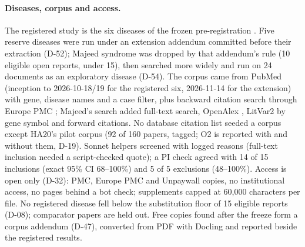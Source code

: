 \documentclass{article} %
\begin{document}
\paragraph{Diseases, corpus and access.} The registered study is the six diseases of the frozen pre-registration \citep{elhani2024_ha20_177,didiasova2020_ssadh_update,koseki2021_tangier_review,almarzanovoa2018_lad1_review,brambatti2019_danon_gender}. Five reserve diseases \citep{wouters2014_blau,vitali2022_lcat,stockleripsiroglu2014_gamt,beyens2018_ats,hajialigol2022_papa} were run under an extension addendum committed before their extraction (D-52); Majeed syndrome \citep{ferguson2021_majeed} was dropped by that addendum's rule (10 eligible open reports, under 15), then searched more widely and run on 24 documents as an exploratory disease (D-54). The corpus came from PubMed (inception to 2026-10-18/19 for the registered six, 2026-11-14 for the extension) with gene, disease names and a case filter, plus backward citation search through Europe PMC \citep{Rosonovski2023EuropePmc}; Majeed's search added full-text search, OpenAlex \citep{Priem2022OpenalexFullyopen}, LitVar2 by gene symbol and forward citations. No database citation list seeded a corpus except HA20's pilot corpus (92 of 160 papers, tagged; O2 is reported with and without them, D-19). Sonnet helpers screened with logged reasons (full-text inclusion needed a script-checked quote); a PI check agreed with 14 of 15 inclusions (exact 95\% CI 68--100\%) and 5 of 5 exclusions (48--100\%). Access is open only (D-32): PMC, Europe PMC and Unpaywall copies, no institutional access, no pages behind a bot check; supplements capped at 60,000 characters per file. No registered disease fell below the substitution floor of 15 eligible reports (D-08); comparator papers are held out. Free copies found after the freeze form a corpus addendum (D-47), converted from PDF with Docling \citep{Auer2024DoclingTechnical} and reported beside the registered results.
\end{document}
